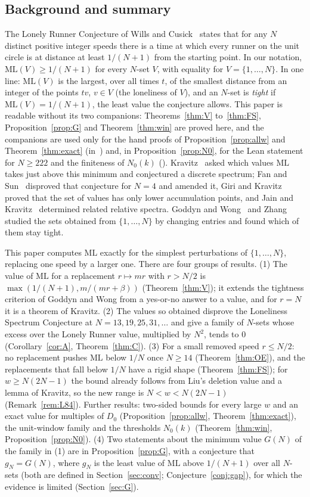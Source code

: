 \documentclass[11pt]{article}
\theoremstyle{definition}
\theoremstyle{remark}
\newcommand{\ML}{\mathrm{ML}}
\newcommand{\xC}[1]{\ref{B-#1}}
\begin{document}
\subsection{Background and summary}
The Lonely Runner Conjecture of Wills and Cusick~\cite{W} states that for any $N$ distinct positive integer speeds there is a time at which every runner on the unit circle is at distance at least $1/(N+1)$ from the starting point. In our notation, $\ML(V)\ge1/(N+1)$ for every $N$-set $V$, with equality for $V=\{1,\dots,N\}$. In one line: $\ML(V)$ is the largest, over all times $t$, of the smallest distance from an integer of the points $tv$, $v\in V$ (the loneliness of $V$), and an $N$-set is \emph{tight} if $\ML(V)=1/(N+1)$, the least value the conjecture allows. This paper is readable without its two companions: Theorems~\ref{thm:V} to~\ref{thm:FS}, Proposition~\ref{prop:G} and Theorem~\ref{thm:win} are proved here, and the companions are used only for the hand proofs of Proposition~\ref{prop:allw} and Theorem~\ref{thm:exact} (in~\cite{A2}) and, in Proposition~\ref{prop:N0}, for the Lean statement for $N\ge222$ and the finiteness of $N_0(k)$ (\cite[Theorems~\xC{thm:W} and~\xC{thm:thr}]{B}). Kravitz~\cite{K} asked which values $\ML$ takes just above this minimum and conjectured a discrete spectrum; Fan and Sun~\cite{FS} disproved that conjecture for $N=4$ and amended it, Giri and Kravitz~\cite{GK} proved that the set of values has only lower accumulation points, and Jain and Kravitz~\cite{JK} determined related relative spectra. Goddyn and Wong~\cite{GW} and Zhang~\cite{Z} studied the sets obtained from $\{1,\dots,N\}$ by changing entries and found which of them stay tight.

This paper computes $\ML$ exactly for the simplest perturbations of $\{1,\dots,N\}$, replacing one speed by a larger one. There are four groups of results. (1) The value of $\ML$ for a replacement $r\mapsto mr$ with $r>N/2$ is $\max(1/(N+1),m/(mr+\beta))$ (Theorem~\ref{thm:V}); it extends the tightness criterion of Goddyn and Wong from a yes-or-no answer to a value, and for $r=N$ it is a theorem of Kravitz. (2) The values so obtained disprove the Loneliness Spectrum Conjecture at $N=13,19,25,31,\dots$ and give a family of $N$-sets whose excess over the Lonely Runner value, multiplied by $N^2$, tends to $0$ (Corollary~\ref{cor:A}, Theorem~\ref{thm:C}). (3) For a small removed speed $r\le N/2$: no replacement pushes $\ML$ below $1/N$ once $N\ge14$ (Theorem~\ref{thm:OE}), and the replacements that fall below $1/N$ have a rigid shape (Theorem~\ref{thm:FS}); for $w\ge N(2N-1)$ the bound already follows from Liu's deletion value and a lemma of Kravitz, so the new range is $N<w<N(2N-1)$ (Remark~\ref{rem:L84}). Further results: two-sided bounds for every large $w$ and an exact value for multiples of $D_0$ (Proposition~\ref{prop:allw}, Theorem~\ref{thm:exact}), the unit-window family and the thresholds $N_0(k)$ (Theorem~\ref{thm:win}, Proposition~\ref{prop:N0}). (4) Two statements about the minimum value $G(N)$ of the family in (1) are in Proposition~\ref{prop:G}, with a conjecture that $g_N=G(N)$, where $g_N$ is the least value of $\ML$ above $1/(N+1)$ over all $N$-sets (both are defined in Section~\ref{sec:conv}; Conjecture~\ref{conj:gap}), for which the evidence is limited (Section~\ref{sec:G}).
\end{document}
